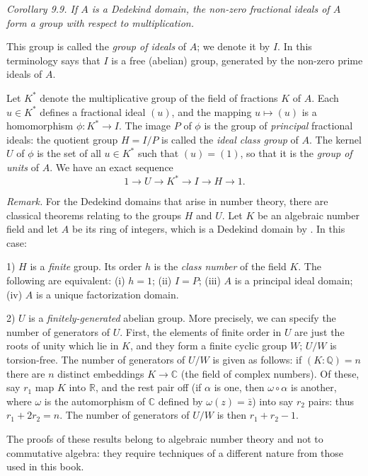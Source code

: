 \noindent\textit{Corollary 9.9. If $A$ is a Dedekind domain, the non-zero fractional ideals of $A$ form a group with respect to multiplication.} \proofbox

This group is called the \textit{group of ideals} of $A$; we denote it by $I$. In this terminology  says that $I$ is a free (abelian) group, generated by the non-zero prime ideals of $A$.

Let $K^*$ denote the multiplicative group of the field of fractions $K$ of $A$. Each $u\in K^*$ defines a fractional ideal $(u)$, and the mapping $u\mapsto(u)$ is a homomorphism $\phi:K^*\longrightarrow I$. The image $P$ of $\phi$ is the group of \textit{principal} fractional ideals: the quotient group $H=I/P$ is called the \textit{ideal class group} of $A$. The kernel $U$ of $\phi$ is the set of all $u\in K^*$ such that $(u)=(1)$, so that it is the \textit{group of units} of $A$. We have an exact sequence
\[
 1\longrightarrow U\longrightarrow K^*\longrightarrow I\longrightarrow H\longrightarrow1.
\]

\noindent\textit{Remark.} For the Dedekind domains that arise in number theory, there are classical theorems relating to the groups $H$ and $U$. Let $K$ be an algebraic number field and let $A$ be its ring of integers, which is a Dedekind domain by . In this case:

1) $H$ is a \textit{finite} group. Its order $h$ is the \textit{class number} of the field $K$. The following are equivalent: (i) $h=1$; (ii) $I=P$; (iii) $A$ is a principal ideal domain; (iv) $A$ is a unique factorization domain.

2) $U$ is a \textit{finitely-generated} abelian group. More precisely, we can specify the number of generators of $U$. First, the elements of finite order in $U$ are just the roots of unity which lie in $K$, and they form a finite cyclic group $W$; $U/W$ is torsion-free. The number of generators of $U/W$ is given as follows: if $(K:\mathbb Q)=n$ there are $n$ distinct embeddings $K\longrightarrow\mathbb C$ (the field of complex numbers). Of these, say $r_1$ map $K$ into $\mathbb R$, and the rest pair off (if $\alpha$ is one, then $\omega\circ\alpha$ is another, where $\omega$ is the automorphism of $\mathbb C$ defined by $\omega(z)=\bar z$) into say $r_2$ pairs: thus $r_1+2r_2=n$. The number of generators of $U/W$ is then $r_1+r_2-1$.

The proofs of these results belong to algebraic number theory and not to commutative algebra: they require techniques of a different nature from those used in this book.

